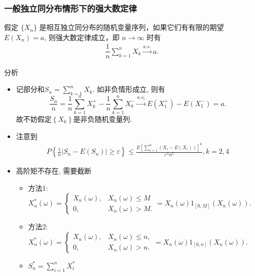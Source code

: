 \begin{frame}
	\frametitle{一般独立同分布情形下的强大数定律}
		\begin{thm}
		假定 $\{X_n\}$ 是相互独立同分布的随机变量序列，如果它们有有限的期望 $E (X_n)=a$, 则强大数定律成立，即 $n\rightarrow\infty$ 时有
		\begin{eqnarray*}
			\dfrac{1}{n}\sum_{k=1}^nX_k\stackrel{a.s.}{\rightarrow} a.
		\end{eqnarray*}
	\end{thm}

	\pause





\end{frame}

\begin{frame}{分析}
	\begin{itemize}[<+-|alert@+>]
	\item 记部分和${S_{n}=\sum_{k=1}^{n} X_{k}}$. 如非负情形成立, 则有
	\[
	\frac{S_{n}}{n}=\frac{1}{n} \sum_{k=1}^{n} X_{k}^{+}-\frac{1}{n} \sum_{k=1}^{n} X_{k}^{-} \stackrel{a . s_{i}}{\longrightarrow} E\left(X_{1}^{+}\right)-E\left(X_{1}^{-}\right)=a .
	\]
	故不妨假定${\left\{X_{k}\right\}}$是非负随机变量列.

	\item 注意到
	\begin{align*}
		P\left\{\frac{1}{n}\left|S_{n}-E\left(S_{n}\right)\right| \geq \varepsilon\right\} \leq \frac{E[\sum_{i=1}^n(X_i-E(X_i))]^k}{\varepsilon^{k}n^k}, k=2, 4%
	\end{align*}
	\item 高阶矩不存在, 需要截断

	\begin{itemize}[<+-|alert@+>]
	\item 方法1: $X_{n}^{*}(\omega)={\left\{\begin{array}{ll}
		X_{n}(\omega), &     X_{n}(\omega) \leq M \\
		0, &     X_{n}(\omega)>M .
		\end{array}=X_{n}(\omega) 1_{[0, M]}\left(X_{n}(\omega)\right) .\right.}$ %
	\item 方法2: $X_{n}^{*}(\omega)={\left\{\begin{array}{ll}
		X_{n}(\omega), &     X_{n}(\omega) \leq n, \\
		0, &     X_{n}(\omega)>n .
		\end{array}=X_{n}(\omega) 1_{[0, n]}\left(X_{n}(\omega)\right) .\right.}$
	\item $S_n^*=\sum_{i=1}^nX_i^*$
	\end{itemize}

	\end{itemize}
\end{frame}

